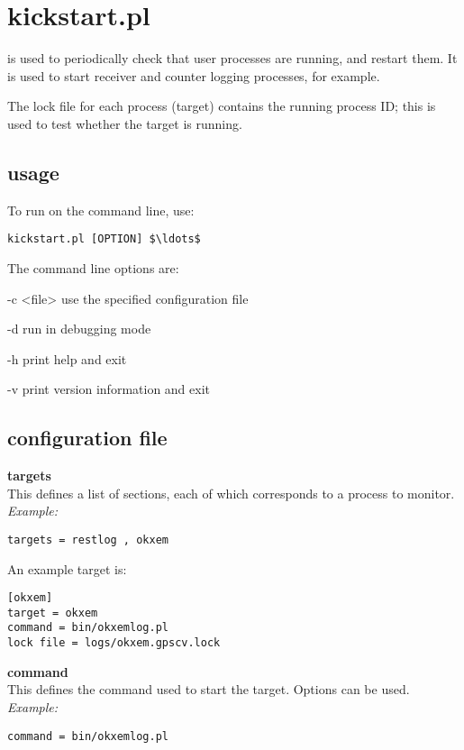 \section{kickstart.pl \label{s:kickstart}}

 is used to periodically check that user processes are running,
and restart them. It is used to start receiver and counter logging processes, for example.

The lock file for each process (target) contains the running process ID; this is used to test whether the
target is running.

\subsection{usage}

To run  on the command line, use:
\begin{lstlisting}[mathescape=true]
kickstart.pl [OPTION] $\ldots$
\end{lstlisting}
The command line options are:
\begin{description*}
	\item[-c \textless file\textgreater] use the specified configuration file
	\item[-d]	run in debugging mode
	\item[-h]	print help and exit
	\item[-v]	print version information and exit
\end{description*}

\subsection{configuration file}

{\bfseries targets}\\
This defines a list of sections, each of which corresponds to a process to monitor.\\
\textit{Example:}
\begin{lstlisting}
targets = restlog , okxem
\end{lstlisting}

An example target is:
\begin{lstlisting}
[okxem]
target = okxem
command = bin/okxemlog.pl 
lock file = logs/okxem.gpscv.lock
\end{lstlisting}

{\bfseries command}\\
This defines the command used to start the target. Options can be used.\\
\textit{Example:}
\begin{lstlisting}
command = bin/okxemlog.pl 
\end{lstlisting}

